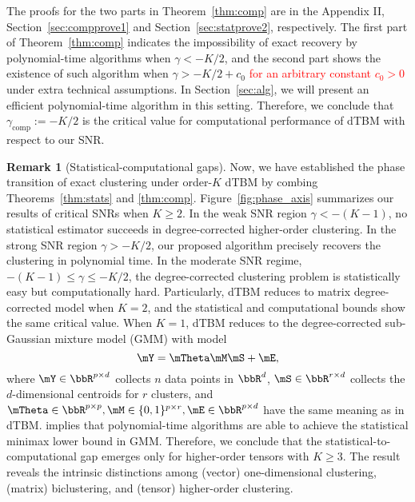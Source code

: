 \documentclass[lettersize,onecolumn,journal]{IEEEtran}
\theoremstyle{definition}
\theoremstyle{definition}
\newtheorem{rmk}{Remark}
\begin{document}
{
\color{blue}
The proofs for the two parts in Theorem~\ref{thm:comp} are in the Appendix II, Section~\ref{sec:compprove1} and Section~\ref{sec:statprove2}, respectively. The first part of Theorem~\ref{thm:comp} indicates the impossibility of exact recovery by polynomial-time algorithms when $\gamma < -K/2$, and the second part shows the existence of such algorithm when $\gamma > -K/2+c_0$ \textcolor{red}{for an arbitrary constant $c_0 > 0$} under extra technical assumptions. In Section~\ref{sec:alg}, we will present an efficient polynomial-time algorithm in this setting. Therefore, we conclude that $\gamma_{\text{comp}}:=-K/2$ is the critical value for computational performance of dTBM with respect to our SNR. 

}


\begin{rmk}[Statistical-computational gaps]
Now, we have established the phase transition of exact clustering under order-$K$ dTBM by combing Theorems~\ref{thm:stats} and \ref{thm:comp}. Figure~\ref{fig:phase_axis} summarizes our results of critical SNRs when $K \geq 2$. In the weak SNR region $\gamma < -(K-1)$, no statistical estimator succeeds in degree-corrected higher-order clustering. In the strong SNR region $\gamma  > -K/2$, our proposed algorithm precisely recovers the clustering in polynomial time. In the moderate SNR regime, $-(K-1)\leq \gamma \leq -K/2$, the degree-corrected clustering problem is statistically easy but computationally hard. Particularly, dTBM reduces to matrix degree-corrected model when $K =2$, and the statistical and computational bounds show the same critical value. When $K =1$, dTBM reduces to the degree-corrected sub-Gaussian mixture model (GMM) with model
\begin{equation}
    \mY = \mTheta \mM \mS + \mE,
\end{equation}
where $\mY \in \bbR^{p \times d}$ collects $n$ data points in $\bbR^d$, $\mS \in \bbR^{r \times d}$ collects the $d$-dimensional centroids for $r$ clusters, and $\mTheta \in \bbR^{p \times p}, \mM \in \{0,1\}^{p \times r}, \mE \in \bbR^{p \times d}$ have the same meaning as in dTBM. \cite{lu2016statistical} implies that polynomial-time algorithms are able to achieve the statistical minimax lower bound in GMM. Therefore, we conclude that the statistical-to-computational gap emerges only for higher-order tensors with $K \geq 3$. The result reveals the intrinsic distinctions among (vector) one-dimensional clustering, (matrix) biclustering, and (tensor) higher-order clustering. 
\end{rmk}
\end{document}
